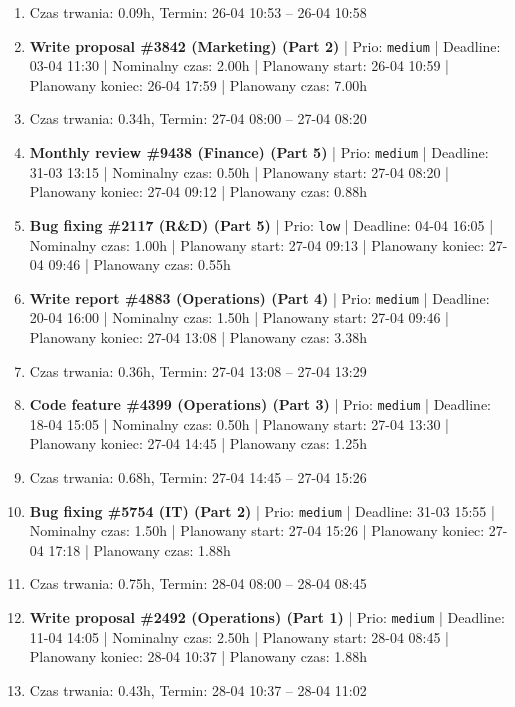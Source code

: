 {\begin{enumerate}
  \item [\textbf{PRZERWA}] Czas trwania: 0.09h, Termin: 26-04 10:53 -- 26-04 10:58
  \item [\textbf{14673}] \textbf{Write proposal \#3842 (Marketing) (Part 2)} | Prio: \texttt{medium} | Deadline: 03-04 11:30 | Nominalny czas: 2.00h | Planowany start: 26-04 10:59 | Planowany koniec: 26-04 17:59 | Planowany czas: 7.00h
  \item [\textbf{PRZERWA}] Czas trwania: 0.34h, Termin: 27-04 08:00 -- 27-04 08:20
  \item [\textbf{14656}] \textbf{Monthly review \#9438 (Finance) (Part 5)} | Prio: \texttt{medium} | Deadline: 31-03 13:15 | Nominalny czas: 0.50h | Planowany start: 27-04 08:20 | Planowany koniec: 27-04 09:12 | Planowany czas: 0.88h
  \item [\textbf{14689}] \textbf{Bug fixing \#2117 (R\&D) (Part 5)} | Prio: \texttt{low} | Deadline: 04-04 16:05 | Nominalny czas: 1.00h | Planowany start: 27-04 09:13 | Planowany koniec: 27-04 09:46 | Planowany czas: 0.55h
  \item [\textbf{14651}] \textbf{Write report \#4883 (Operations) (Part 4)} | Prio: \texttt{medium} | Deadline: 20-04 16:00 | Nominalny czas: 1.50h | Planowany start: 27-04 09:46 | Planowany koniec: 27-04 13:08 | Planowany czas: 3.38h
  \item [\textbf{PRZERWA}] Czas trwania: 0.36h, Termin: 27-04 13:08 -- 27-04 13:29
  \item [\textbf{14664}] \textbf{Code feature \#4399 (Operations) (Part 3)} | Prio: \texttt{medium} | Deadline: 18-04 15:05 | Nominalny czas: 0.50h | Planowany start: 27-04 13:30 | Planowany koniec: 27-04 14:45 | Planowany czas: 1.25h
  \item [\textbf{PRZERWA}] Czas trwania: 0.68h, Termin: 27-04 14:45 -- 27-04 15:26
  \item [\textbf{14631}] \textbf{Bug fixing \#5754 (IT) (Part 2)} | Prio: \texttt{medium} | Deadline: 31-03 15:55 | Nominalny czas: 1.50h | Planowany start: 27-04 15:26 | Planowany koniec: 27-04 17:18 | Planowany czas: 1.88h
  \item [\textbf{PRZERWA}] Czas trwania: 0.75h, Termin: 28-04 08:00 -- 28-04 08:45
  \item [\textbf{14668}] \textbf{Write proposal \#2492 (Operations) (Part 1)} | Prio: \texttt{medium} | Deadline: 11-04 14:05 | Nominalny czas: 2.50h | Planowany start: 28-04 08:45 | Planowany koniec: 28-04 10:37 | Planowany czas: 1.88h
  \item [\textbf{PRZERWA}] Czas trwania: 0.43h, Termin: 28-04 10:37 -- 28-04 11:02

\end{enumerate}}
